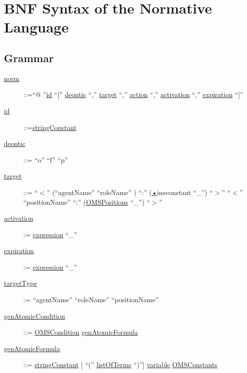\chapter{BNF Syntax of the Normative \\ Language} \label{app:BNFSyntax}
\section{Grammar}
\begin{description}
	\item[\underline{norm}] ::=``@ ''\underline{id} ``['' \underline{deontic} ``,'' \underline{target} ``,'' \underline{action} ``,'' \underline{activation} ``,'' \underline{expiration} ``]''
\item	[\underline{id}] ::=\underline{stringConstant}  

\item[\underline{deontic}] ::= ``o'' \textbar  ``f'' \textbar ``p''

\item[\underline{target}] ::= ``$<$'' (``agentName'' \textbar ``roleName'' ) ``:'' (\underline{•}ine{constant} \textbar ``\_'') ``$>$'' \textbar  ``$<$'' ``positionName''  ``:'' (\underline{OMSPositions} \textbar ``\_'') ``$>$''
\item[\underline{activation}]:= \underline{expression}  \textbar ``\_''

\item[\underline{expiration}]:= \underline{expression}  \textbar ``\_''

\item[\underline{targetType}]:= ``agentName'' \textbar ``roleName'' \textbar ``positionName''


\item[\underline{genAtomicCondition}] ::= \underline{OMSCondition} \textbar \underline{genAtomicFormula}

\item[\underline{genAtomicFormula}]::= \underline{stringConstant}  $[$ ``('' \underline{listOfTerms} ``)''$]$   \textbar \underline{variable}  \textbar \underline{OMSConstants}



\end{description}
